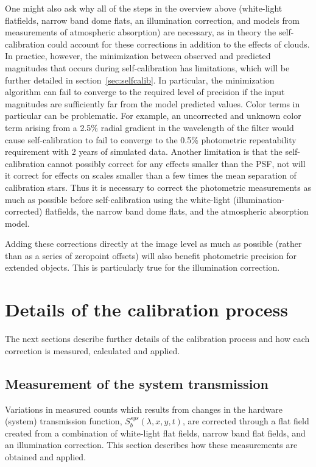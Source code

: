 \documentclass[12pt,preprint]{aastex}
\begin{document}
One might also ask why all of the steps in the overview above
(white-light flatfields, narrow band dome flats, an illumination
correction, and models from measurements of atmospheric absorption)
are necessary, as in theory the self-calibration could account for
these corrections in addition to the effects of clouds. In practice,
however, the minimization between observed and predicted magnitudes
that occurs during self-calibration has limitations, which will be
further detailed in section~\ref{sec:selfcalib}.  In particular, the
minimization algorithm can fail to converge to the required level of
precision if the input magnitudes are sufficiently far from the model
predicted values.  Color terms in particular can be problematic. For
example, an uncorrected and unknown color term arising from a 2.5\%
radial gradient in the wavelength of the filter would cause
self-calibration to fail to converge to the 0.5\% photometric
repeatability requirement with 2 years of simulated data. Another
limitation is that the self-calibration cannot possibly correct for
any effects smaller than the PSF, not will it correct for
effects on scales smaller than a few times the mean separation of
calibration stars. Thus it is necessary to correct the photometric
measurements as much as possible before self-calibration using the
white-light (illumination-corrected) flatfields, the narrow band dome
flats, and the atmospheric absorption model.

Adding these corrections directly at the image level as much as
possible (rather than as a series of zeropoint offsets) will also
benefit photometric precision for extended objects. This is
particularly true for the illumination correction.

\section{Details of the calibration process}

The next sections describe further details of the calibration process
and how each correction is measured, calculated and applied. 

\subsection{Measurement of the system transmission}

Variations in measured counts which results from changes in the hardware
(system) transmission function, $S_b^{sys}(\lambda,x,y,t)$, are corrected
through a flat field created from a combination of white-light flat
fields, narrow band flat fields, and an illumination correction.  This
section describes how these measurements are obtained and applied.
\end{document}
